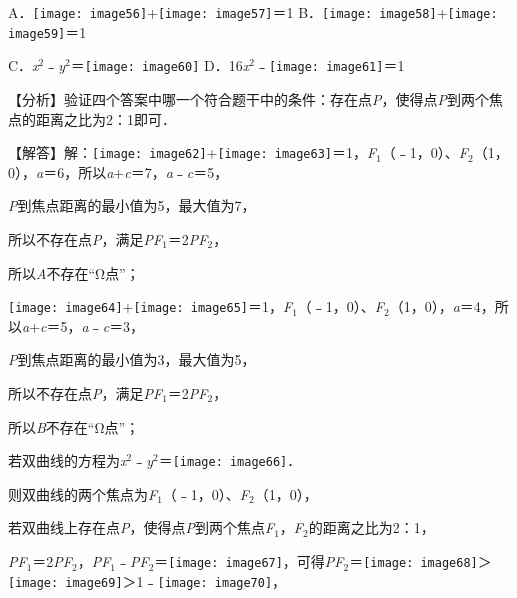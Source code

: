 \documentclass[a4paper,11pt,UTF8,twoside]{ctexart} %
\begin{document}
A．\texttt{[image: image56]}+\texttt{[image: image57]}＝1 B．\texttt{[image: image58]}+\texttt{[image: image59]}＝1 

C．\textit{x}${}^{2}$﹣\textit{y}${}^{2}$＝\texttt{[image: image60]} D．16\textit{x}${}^{2}$﹣\texttt{[image: image61]}＝1

【分析】验证四个答案中哪一个符合题干中的条件：存在点\textit{P}，使得点\textit{P}到两个焦点的距离之比为2：1即可．

【解答】解：\texttt{[image: image62]}+\texttt{[image: image63]}＝1，\textit{F}${}_{1}$（﹣1，0）、\textit{F}${}_{2}$（1，0），\textit{a}＝6，所以\textit{a}+\textit{c}＝7，\textit{a}﹣\textit{c}＝5，

\textit{P}到焦点距离的最小值为5，最大值为7，

所以不存在点\textit{P}，满足{\textbar}\textit{PF}${}_{1}${\textbar}＝2{\textbar}\textit{PF}${}_{2}${\textbar}，

所以\textit{A}不存在``$\mathrm{\Omega }$点''；

\texttt{[image: image64]}+\texttt{[image: image65]}＝1，\textit{F}${}_{1}$（﹣1，0）、\textit{F}${}_{2}$（1，0），\textit{a}＝4，所以\textit{a}+\textit{c}＝5，\textit{a}﹣\textit{c}＝3，

\textit{P}到焦点距离的最小值为3，最大值为5，

所以不存在点\textit{P}，满足{\textbar}\textit{PF}${}_{1}${\textbar}＝2{\textbar}\textit{PF}${}_{2}${\textbar}，

所以\textit{B}不存在``$\mathrm{\Omega }$点''；

若双曲线的方程为\textit{x}${}^{2}$﹣\textit{y}${}^{2}$＝\texttt{[image: image66]}．

则双曲线的两个焦点为\textit{F}${}_{1}$（﹣1，0）、\textit{F}${}_{2}$（1，0），

若双曲线上存在点\textit{P}，使得点\textit{P}到两个焦点\textit{F}${}_{1}$，\textit{F}${}_{2}$的距离之比为2：1，

{\textbar}\textit{PF}${}_{1}${\textbar}＝2{\textbar}\textit{PF}${}_{2}${\textbar}，{\textbar}\textit{PF}${}_{1}${\textbar}﹣{\textbar}\textit{PF}${}_{2}${\textbar}＝\texttt{[image: image67]}，可得{\textbar}\textit{PF}${}_{2}${\textbar}＝\texttt{[image: image68]}＞\texttt{[image: image69]}＞1﹣\texttt{[image: image70]}，
\end{document}
